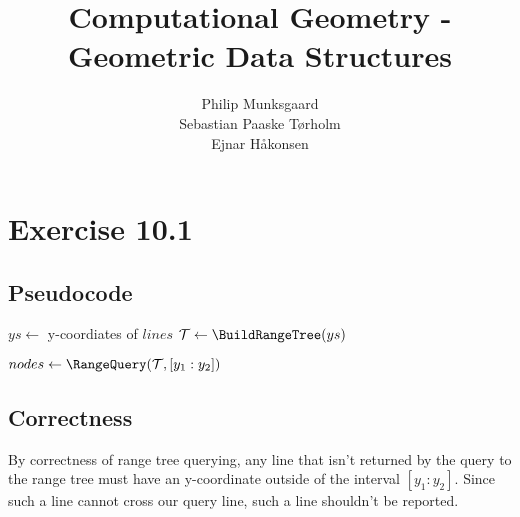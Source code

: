 \documentclass[11pt,a4paper]{article}
\title{Computational Geometry - Geometric Data Structures}
\author{Philip Munksgaard \\ Sebastian Paaske Tørholm \\ Ejnar Håkonsen}
\begin{document}
\maketitle

\section{Exercise 10.1}
\subsection{Pseudocode}
\begin{algorithm}[H]
	\caption{$lines$\FuncSty{)}}

	\SetArgSty{}

    $ys \leftarrow $ y-coordiates of $lines$\;
    $\mathcal{T} \leftarrow \BuildRangeTree(ys)$\; 

    \;
\end{algorithm}

\begin{algorithm}[H]

    \caption{$\mathcal{T},x,[y_1 : y_2]$\FuncSty{)}}
	
	\SetArgSty{}

    $nodes \leftarrow \RangeQuery(\mathcal{T}, [y_1 : y_2])$\; 

\end{algorithm}

\subsection{Correctness}
By correctness of range tree querying, any line that isn't returned by the query
to the range tree must have an y-coordinate outside of the interval $[y_1 : y_2]$.
Since such a line cannot cross our query line, such a line shouldn't be reported.
\end{document}
